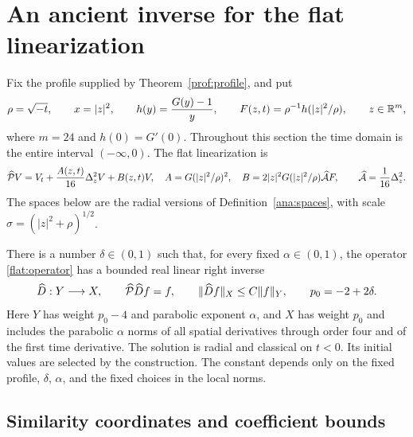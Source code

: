 \section{An ancient inverse for the flat linearization}
\label{sec:flat}

Fix the profile supplied by Theorem~\ref{prof:profile}, and put
\[
 \rho=\sqrt{-t},\qquad x=|z|^2,\qquad
 h(y)=\frac{G(y)-1}{y},\qquad
 F(z,t)=\rho^{-1}h(|z|^2/\rho),\qquad z\in\mathbb{R}^m,
\]
where $m=24$ and $h(0)=G'(0)$. Throughout this section the time
domain is the entire interval $(-\infty,0)$. The flat linearization is
\begin{equation}\label{flat:operator}
 \widehat{\mathcal P}V
 =V_t+\frac{A(z,t)}{16}\Delta_z^2V+B(z,t)V,
 \quad
 A=G(|z|^2/\rho)^2,\quad
 B=2|z|^2G(|z|^2/\rho)\widehat{\mathcal A}F,
 \qquad \widehat{\mathcal A}=\frac1{16}\Delta_z^2.
\end{equation}
The spaces below are the radial versions of Definition~\ref{ana:spaces},
with scale $\sigma=(|z|^2+\rho)^{1/2}$.

\begin{theorem}\label{flat:inverse}
There is a number $\delta\in(0,1)$ such that, for every fixed
$\alpha\in(0,1)$, the operator \eqref{flat:operator} has a bounded real
linear right inverse
\[
 \widehat D:Y\longrightarrow X,\qquad
 \widehat{\mathcal P}\widehat D f=f,\qquad
 \|\widehat D f\|_X\le C\|f\|_Y,
 \qquad p_0=-2+2\delta.
\]
Here $Y$ has weight $p_0-4$ and parabolic exponent $\alpha$, and $X$
has weight $p_0$ and includes the parabolic $\alpha$ norms of all
spatial derivatives through order four and of the first time
derivative. The solution is radial and classical on $t<0$.
Its initial values are selected by the construction. The constant
depends only on the fixed profile, $\delta$, $\alpha$, and the fixed
choices in the local norms.
\end{theorem}

\subsection{Similarity coordinates and coefficient bounds}

